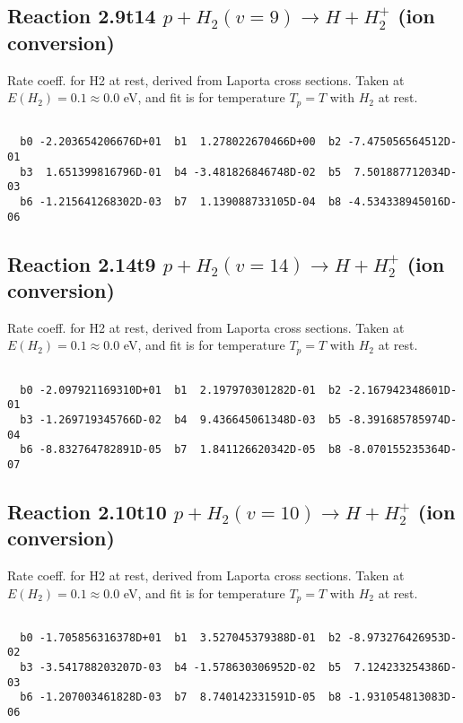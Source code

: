 \documentclass[12pt,dvipdfmx]{article}
\begin{document}
\newpage
\subsection{
Reaction 2.9t14
$ p + H_2(v=9) \rightarrow H + H_2^+$ (ion conversion)
}
Rate coeff. for H2 at rest, derived from Laporta cross sections.
Taken at $E(H_2) = 0.1 \approx 0.0$ eV,  and fit is for temperature $T_p=T$ with $H_2$ at rest.

\begin{small}\begin{verbatim}

  b0 -2.203654206676D+01  b1  1.278022670466D+00  b2 -7.475056564512D-01
  b3  1.651399816796D-01  b4 -3.481826846748D-02  b5  7.501887712034D-03
  b6 -1.215641268302D-03  b7  1.139088733105D-04  b8 -4.534338945016D-06

\end{verbatim}\end{small}

\newpage
\subsection{
Reaction 2.14t9
$ p + H_2(v=14) \rightarrow H + H_2^+$ (ion conversion)
}
Rate coeff. for H2 at rest, derived from Laporta cross sections.
Taken at $E(H_2) = 0.1 \approx 0.0$ eV,  and fit is for temperature $T_p=T$ with $H_2$ at rest.

\begin{small}\begin{verbatim}

  b0 -2.097921169310D+01  b1  2.197970301282D-01  b2 -2.167942348601D-01
  b3 -1.269719345766D-02  b4  9.436645061348D-03  b5 -8.391685785974D-04
  b6 -8.832764782891D-05  b7  1.841126620342D-05  b8 -8.070155235364D-07

\end{verbatim}\end{small}

\newpage
\subsection{
Reaction 2.10t10
$ p + H_2(v=10) \rightarrow H + H_2^+$ (ion conversion)
}
Rate coeff. for H2 at rest, derived from Laporta cross sections.
Taken at $E(H_2) = 0.1 \approx 0.0$ eV,  and fit is for temperature $T_p=T$ with $H_2$ at rest.

\begin{small}\begin{verbatim}

  b0 -1.705856316378D+01  b1  3.527045379388D-01  b2 -8.973276426953D-02
  b3 -3.541788203207D-03  b4 -1.578630306952D-02  b5  7.124233254386D-03
  b6 -1.207003461828D-03  b7  8.740142331591D-05  b8 -1.931054813083D-06

\end{verbatim}\end{small}
\end{document}
